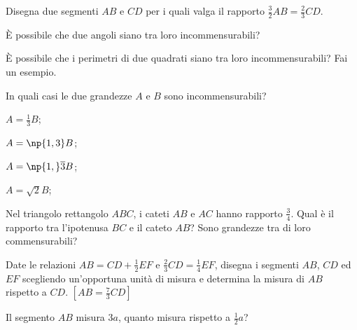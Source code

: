 \begin{esercizio}
\label{ese:6.5}
Disegna due segmenti $AB$ e $CD$ per i quali valga il rapporto $\frac{3}{2}AB=\frac{2}{3}CD$.
\end{esercizio}

\begin{esercizio}
\label{ese:6.6}
\`E possibile che due angoli siano tra loro incommensurabili?
\end{esercizio}

\begin{esercizio}
\label{ese:6.7}
\`E possibile che i perimetri di due quadrati siano tra loro incommensurabili? Fai un esempio.
\end{esercizio}

\begin{esercizio}
\label{ese:6.8}
In quali casi le due grandezze $A$ e $B$ sono incommensurabili?
\begin{multicols}{4}
\begin{enumeratea}
\item $A=\frac{1}{3}B$;
\item $A=\np{1,3}B$;
\item $A=\np{1,}\overline{3}B$;
\item $A=\sqrt{2}B$;
\end{enumeratea}
\end{multicols}
\end{esercizio}

\begin{esercizio}
\label{ese:6.9}
Nel triangolo rettangolo $ABC$, i cateti $AB$ e $AC$ hanno rapporto $\frac{3}{4}$. Qual è il rapporto tra  l'ipotenusa $BC$ e il cateto $AB$? Sono grandezze tra di loro commensurabili?
\end{esercizio}

\begin{esercizio}
\label{ese:6.10}
Date le relazioni $AB=CD+\frac{1}{2}EF$ e $\frac{2}{3}CD=\frac{1}{4}EF$, disegna i segmenti $AB$, $CD$ ed $EF$ scegliendo un'opportuna unità di misura e determina la misura di $AB$ rispetto a $CD$. $[AB=\frac{7}{3}CD]$
\end{esercizio}

\begin{esercizio}
\label{ese:6.11}
Il segmento $AB$ misura $3a$, quanto misura rispetto a $\frac{1}{2}a$? 
\end{esercizio}

